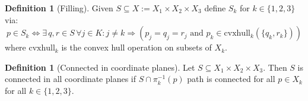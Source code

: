 \documentclass[12pt,parskip=full]{report}
\theoremstyle{plain}
\theoremstyle{definition}
\newtheorem{dfn}[thm]{Definition}
\begin{document}
\begin{dfn}
	[Filling]
	\label{defn:filling}
    Given \(S \subseteq X := X_1\times X_2\times X_3\) define \(S_{k}\) for \(k \in \{1,2,3\}\) via: 
    \[
        p \in S_{k} \iff \exists 
        \,q,r\in S\, \forall j\in K: j\neq k 
        \Longrightarrow ( p_{j} = q_{j} = r_{j}
        \text{ and } p_{k} \in \text{cvxhull}_k (\{q_{k} , r_{k}\}))
    \] 
    where \(\text{cvxhull}_k\) is the convex hull operation on subsets of \(X_k\).
\end{dfn}

\begin{dfn}
    [Connected in coordinate planes]
    \label{defn:ccp} 
    Let \(S \subseteq X_1\times X_2\times X_3\). Then \(S\) is connected in all coordinate planes if \(S \cap \pi_{k}^{-1} (p)\) path is connected for all \(p \in X_{k}\) for all \(k\in \{1,2,3\}\).
\end{dfn}
\end{document}

